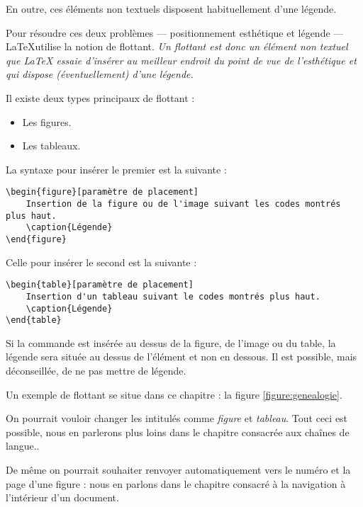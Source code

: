 \begin{description}
En outre, ces éléments non textuels disposent habituellement d'une légende.

Pour résoudre ces deux problèmes --- positionnement esthétique et légende --- \LaTeX utilise la notion de flottant. \emph{Un flottant est donc un élément non textuel que LaTeX essaie d'insérer au meilleur endroit du point de vue de l'esthétique et qui dispose (éventuellement) d'une légende.}

Il existe deux types principaux de flottant :
\begin{itemize}
	\item Les figures.
	\item Les tableaux.
\end{itemize}

La syntaxe pour insérer le premier est la suivante :

\begin{verbatim}
\begin{figure}[paramètre de placement]
	Insertion de la figure ou de l'image suivant les codes montrés plus haut.
	\caption{Légende}
\end{figure} 
\end{verbatim}

Celle pour insérer le second est la suivante :
\begin{verbatim}
\begin{table}[paramètre de placement]
	Insertion d'un tableau suivant le codes montrés plus haut.
	\caption{Légende}
\end{table} 
\end{verbatim}

Si la commande  est insérée au dessus de la figure, de l'image ou du table, la légende sera située au dessus de l'élément et non en dessous. Il est possible, mais déconseillée, de ne pas mettre de légende.

Un exemple de flottant se situe  dans ce chapitre : la figure \ref{figure:genealogie}.
\begin{attention}
	On pourrait vouloir changer les intitulés comme \emph{figure} et \emph{tableau}. Tout ceci est possible, nous en parlerons plus loins dans le chapitre consacrée aux chaînes de langue..
	
	De même on pourrait souhaiter renvoyer automatiquement vers le numéro et la page d'une figure : nous en parlons dans le chapitre consacré à la navigation à l'intérieur d'un document.
\end{attention}


\end{description}
